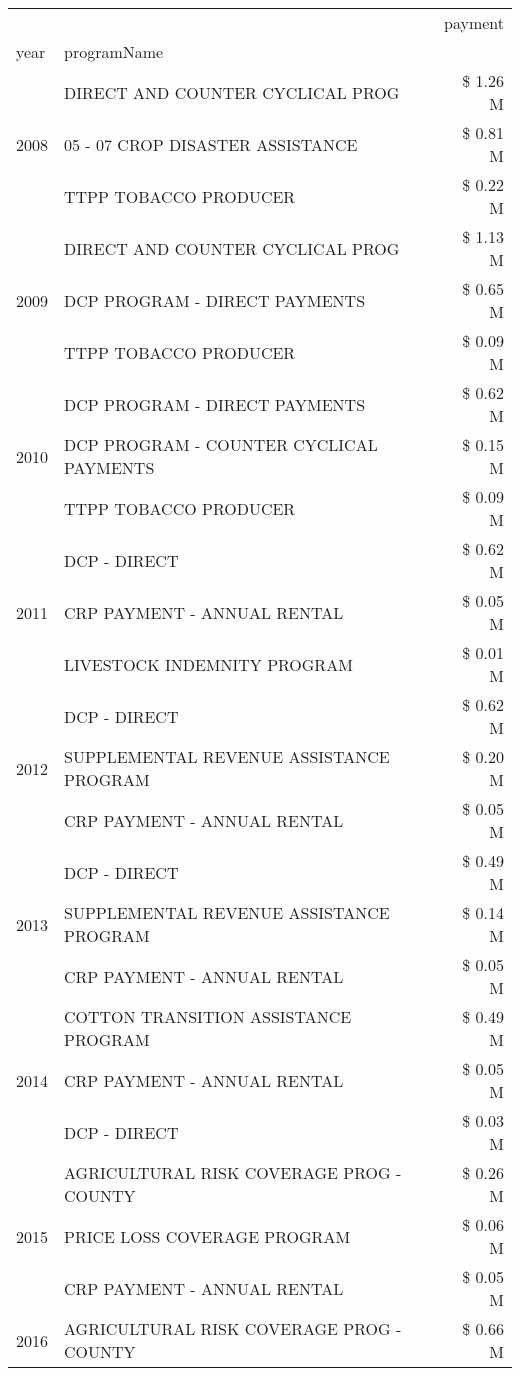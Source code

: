 \begin{tabular}{llr}
\toprule
 &  & payment \\
year & programName &  \\
\midrule
\multirow[t]{3}{*}{2008} & DIRECT AND COUNTER CYCLICAL PROG & \$ 1.26 M \\
 & 05 - 07 CROP DISASTER ASSISTANCE & \$ 0.81 M \\
 & TTPP TOBACCO PRODUCER & \$ 0.22 M \\
\cline{1-3}
\multirow[t]{3}{*}{2009} & DIRECT AND COUNTER CYCLICAL PROG & \$ 1.13 M \\
 & DCP PROGRAM - DIRECT PAYMENTS & \$ 0.65 M \\
 & TTPP TOBACCO PRODUCER & \$ 0.09 M \\
\cline{1-3}
\multirow[t]{3}{*}{2010} & DCP PROGRAM - DIRECT PAYMENTS & \$ 0.62 M \\
 & DCP PROGRAM - COUNTER CYCLICAL PAYMENTS & \$ 0.15 M \\
 & TTPP TOBACCO PRODUCER & \$ 0.09 M \\
\cline{1-3}
\multirow[t]{3}{*}{2011} & DCP - DIRECT & \$ 0.62 M \\
 & CRP PAYMENT - ANNUAL RENTAL & \$ 0.05 M \\
 & LIVESTOCK INDEMNITY PROGRAM & \$ 0.01 M \\
\cline{1-3}
\multirow[t]{3}{*}{2012} & DCP - DIRECT & \$ 0.62 M \\
 & SUPPLEMENTAL REVENUE ASSISTANCE PROGRAM & \$ 0.20 M \\
 & CRP PAYMENT - ANNUAL RENTAL & \$ 0.05 M \\
\cline{1-3}
\multirow[t]{3}{*}{2013} & DCP - DIRECT & \$ 0.49 M \\
 & SUPPLEMENTAL REVENUE ASSISTANCE PROGRAM & \$ 0.14 M \\
 & CRP PAYMENT - ANNUAL RENTAL & \$ 0.05 M \\
\cline{1-3}
\multirow[t]{3}{*}{2014} & COTTON TRANSITION ASSISTANCE PROGRAM & \$ 0.49 M \\
 & CRP PAYMENT - ANNUAL RENTAL & \$ 0.05 M \\
 & DCP - DIRECT & \$ 0.03 M \\
\cline{1-3}
\multirow[t]{3}{*}{2015} & AGRICULTURAL RISK COVERAGE PROG - COUNTY & \$ 0.26 M \\
 & PRICE LOSS COVERAGE PROGRAM & \$ 0.06 M \\
 & CRP PAYMENT - ANNUAL RENTAL & \$ 0.05 M \\
\cline{1-3}
\multirow[t]{3}{*}{2016} & AGRICULTURAL RISK COVERAGE PROG - COUNTY & \$ 0.66 M \\

\end{tabular}
